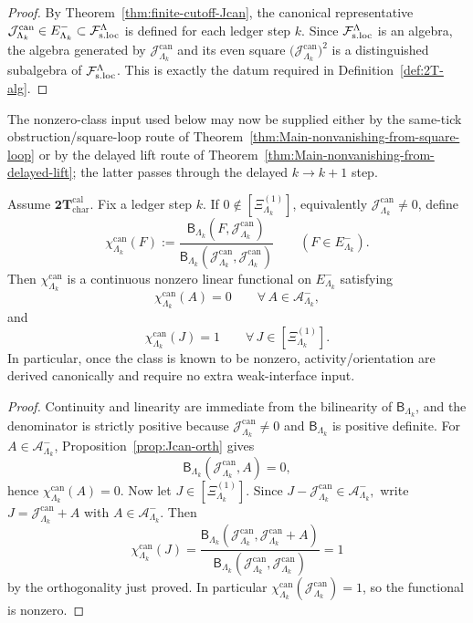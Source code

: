 \begin{proof}
By Theorem~\ref{thm:finite-cutoff-Jcan}, the canonical representative
\(\mathcal J^{\mathrm{can}}_{\Lambda_k}\in E^-_{\Lambda_k}\subset\mathcal F_{\mathrm{s.loc}}^\Lambda\) is defined for each
ledger step \(k\). Since \(\mathcal F_{\mathrm{s.loc}}^\Lambda\) is an algebra, the algebra generated by
\(\mathcal J^{\mathrm{can}}_{\Lambda_k}\) and its even square
\(\bigl(\mathcal J^{\mathrm{can}}_{\Lambda_k}\bigr)^2\) is a distinguished subalgebra of
\(\mathcal F_{\mathrm{s.loc}}^\Lambda\). This is exactly the datum required in Definition~\ref{def:2T-alg}.

\end{proof}

The nonzero-class input used below may now be supplied either by the same-tick
obstruction/square-loop route of Theorem~\ref{thm:Main-nonvanishing-from-square-loop}
or by the delayed lift route of
Theorem~\ref{thm:Main-nonvanishing-from-delayed-lift}; the latter passes through
the delayed \(k\to k+1\) step.

\begin{proposition}
\label{prop:char-activity-from-nonzero-class}
Assume \(\mathbf{2T}_{\mathrm{char}}^{\mathrm{cal}}\). Fix a ledger step \(k\).
If \(0\notin[\Xi^{(1)}_{\Lambda_k}]\), equivalently
\(\mathcal J^{\mathrm{can}}_{\Lambda_k}\neq 0\), define
\[
\chi^{\mathrm{can}}_{\Lambda_k}(F)
:=
\frac{\mathsf B_{\Lambda_k}(F,\mathcal J^{\mathrm{can}}_{\Lambda_k})}
{\mathsf B_{\Lambda_k}(\mathcal J^{\mathrm{can}}_{\Lambda_k},\mathcal J^{\mathrm{can}}_{\Lambda_k})}
\qquad
(F\in E^-_{\Lambda_k}).
\]
Then \(\chi^{\mathrm{can}}_{\Lambda_k}\) is a continuous nonzero linear functional on
\(E^-_{\Lambda_k}\) satisfying
\[
\chi^{\mathrm{can}}_{\Lambda_k}(A)=0
\qquad
\forall\,A\in\mathcal A^-_{\Lambda_k},
\]
and
\[
\chi^{\mathrm{can}}_{\Lambda_k}(J)=1
\qquad
\forall\,J\in[\Xi^{(1)}_{\Lambda_k}].
\]
In particular, once the class is known to be nonzero, activity/orientation are
derived canonically and require no extra weak-interface input.
\end{proposition}

\begin{proof}
Continuity and linearity are immediate from the bilinearity of \(\mathsf B_{\Lambda_k}\),
and the denominator is strictly positive because
\(\mathcal J^{\mathrm{can}}_{\Lambda_k}\neq 0\) and \(\mathsf B_{\Lambda_k}\) is positive
definite.
For \(A\in\mathcal A^-_{\Lambda_k}\), Proposition~\ref{prop:Jcan-orth} gives
\[
\mathsf B_{\Lambda_k}(\mathcal J^{\mathrm{can}}_{\Lambda_k},A)=0,
\]
hence \(\chi^{\mathrm{can}}_{\Lambda_k}(A)=0\).
Now let \(J\in[\Xi^{(1)}_{\Lambda_k}]\). Since
\(
J-\mathcal J^{\mathrm{can}}_{\Lambda_k}\in\mathcal A^-_{\Lambda_k},
\)
write \(J=\mathcal J^{\mathrm{can}}_{\Lambda_k}+A\) with
\(A\in\mathcal A^-_{\Lambda_k}\). Then
\[
\chi^{\mathrm{can}}_{\Lambda_k}(J)
=
\frac{\mathsf B_{\Lambda_k}(\mathcal J^{\mathrm{can}}_{\Lambda_k},\mathcal J^{\mathrm{can}}_{\Lambda_k}+A)}
{\mathsf B_{\Lambda_k}(\mathcal J^{\mathrm{can}}_{\Lambda_k},\mathcal J^{\mathrm{can}}_{\Lambda_k})}
=
1
\]
by the orthogonality just proved.  In particular
\(\chi^{\mathrm{can}}_{\Lambda_k}(\mathcal J^{\mathrm{can}}_{\Lambda_k})=1\), so the functional is
nonzero.
\end{proof}

